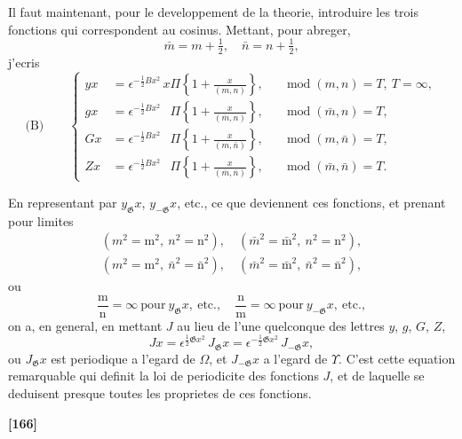 \documentclass[11pt,a4paper]{article}
\DeclareMathOperator{\modd}{mod}
\begin{document}
Il faut maintenant, pour le developpement de la theorie, introduire les trois fonctions
qui correspondent au cosinus. Mettant, pour abreger,
\begin{equation}
\bar{m} = m + \tfrac{1}{2},\quad \bar{n} = n + \tfrac{1}{2}, \tag{20}
\end{equation}
j'ecris
\begin{equation*}
\text{(B)}\qquad
\left\{
\begin{aligned}
yx &= \epsilon^{-\frac{1}{2}Bx^2}\, x\Pi \left\{1 + \frac{x}{(m, n)}\right\}, && \modd(m, n) = T,\ T = \infty,\\
gx &= \epsilon^{-\frac{1}{2}Bx^2}\, \phantom{x}\Pi \left\{1 + \frac{x}{(\bar{m}, n)}\right\}, && \modd(\bar{m}, n) = T,\\
Gx &= \epsilon^{-\frac{1}{2}Bx^2}\, \phantom{x}\Pi \left\{1 + \frac{x}{(m, \bar{n})}\right\}, && \modd(m, \bar{n}) = T,\\
Zx &= \epsilon^{-\frac{1}{2}Bx^2}\, \phantom{x}\Pi \left\{1 + \frac{x}{(\bar{m}, \bar{n})}\right\}, && \modd(\bar{m}, \bar{n}) = T.
\end{aligned}
\right.
\end{equation*}

En representant par $y_{\mathfrak{G}}x$, $y_{-\mathfrak{G}}x$, etc., ce que deviennent ces fonctions, et prenant pour
limites
\begin{gather*}
(m^2 = \mathrm{m}^2,\ n^2 = \mathrm{n}^2),\quad (\bar{m}^2 = \bar{\mathrm{m}}^2,\ n^2 = \mathrm{n}^2),\\
(m^2 = \mathrm{m}^2,\ \bar{n}^2 = \bar{\mathrm{n}}^2),\quad (\bar{m}^2 = \bar{\mathrm{m}}^2,\ \bar{n}^2 = \bar{\mathrm{n}}^2),
\end{gather*}
ou
\[\frac{\mathrm{m}}{\mathrm{n}} = \infty\ \text{pour}\ y_{\mathfrak{G}}x,\ \text{etc.},\quad \frac{\mathrm{n}}{\mathrm{m}} = \infty\ \text{pour}\ y_{-\mathfrak{G}}x,\ \text{etc.},\]
on a, en general, en mettant $J$ au lieu de l'une quelconque des lettres $y$, $g$, $G$, $Z$,
\begin{equation}
Jx = \epsilon^{\frac{1}{2}\mathfrak{G}x^2}\, J_{\mathfrak{G}}x = \epsilon^{-\frac{1}{2}\mathfrak{G}x^2}\, J_{-\mathfrak{G}}x, \tag{21}
\end{equation}
ou $J_{\mathfrak{G}}x$ est periodique a l'egard de $\Omega$, et $J_{-\mathfrak{G}}x$ a l'egard de $\Upsilon$. C'est cette equation
remarquable qui definit la loi de periodicite des fonctions $J$, et de laquelle se deduisent
presque toutes les proprietes de ces fonctions.

\textbf{[166]}
\end{document}
